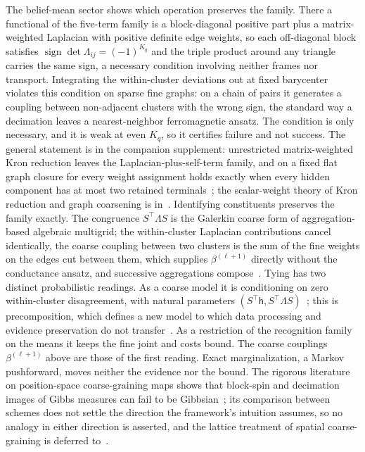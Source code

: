 The belief-mean sector shows which operation preserves the family. There a functional of the five-term family is a block-diagonal positive part plus a matrix-weighted Laplacian with positive definite edge weights, so each off-diagonal block satisfies $\operatorname{sign}\det\Lambda_{ij} = (-1)^{K_q}$ and the triple product around any triangle carries the same sign, a necessary condition involving neither frames nor transport. Integrating the within-cluster deviations out at fixed barycenter violates this condition on sparse fine graphs: on a chain of pairs it generates a coupling between non-adjacent clusters with the wrong sign, the standard way a decimation leaves a nearest-neighbor ferromagnetic ansatz. The condition is only necessary, and it is weak at even $K_q$, so it certifies failure and not success. The general statement is in the companion supplement: unrestricted matrix-weighted Kron reduction leaves the Laplacian-plus-self-term family, and on a fixed flat graph closure for every weight assignment holds exactly when every hidden component has at most two retained terminals~\cite[Ch.~G7]{DennisGaugeVFESuppG2026}; the scalar-weight theory of Kron reduction and graph coarsening is in~\cite{DorflerBullo2013Kron, Loukas2019, villegas2023laplacian}. Identifying constituents preserves the family exactly. The congruence $S^\top\Lambda S$ is the Galerkin coarse form of aggregation-based algebraic multigrid; the within-cluster Laplacian contributions cancel identically, the coarse coupling between two clusters is the sum of the fine weights on the edges cut between them, which supplies $\beta^{(\ell+1)}$ directly without the conductance ansatz, and successive aggregations compose~\cite[Ch.~G9]{DennisGaugeVFESuppG2026}. Tying has two distinct probabilistic readings. As a coarse model it is conditioning on zero within-cluster disagreement, with natural parameters $(S^\top \mathsf{h}, S^\top\Lambda S)$~\cite[Ch.~G7]{DennisGaugeVFESuppG2026}; this is precomposition, which defines a new model to which data processing and evidence preservation do not transfer~\cite[Ch.~9]{DennisGaugeVFE2026}. As a restriction of the recognition family on the means it keeps the fine joint and costs bound. The coarse couplings $\beta^{(\ell+1)}$ above are those of the first reading. Exact marginalization, a Markov pushforward, moves neither the evidence nor the bound. The rigorous literature on position-space coarse-graining maps shows that block-spin and decimation images of Gibbs measures can fail to be Gibbsian~\cite{VanEnterFernandezSokal1993}; its comparison between schemes does not settle the direction the framework's intuition assumes, so no analogy in either direction is asserted, and the lattice treatment of spatial coarse-graining is deferred to~\cite[Chs.~B7--B9]{DennisGaugeVFESuppB2026}.

